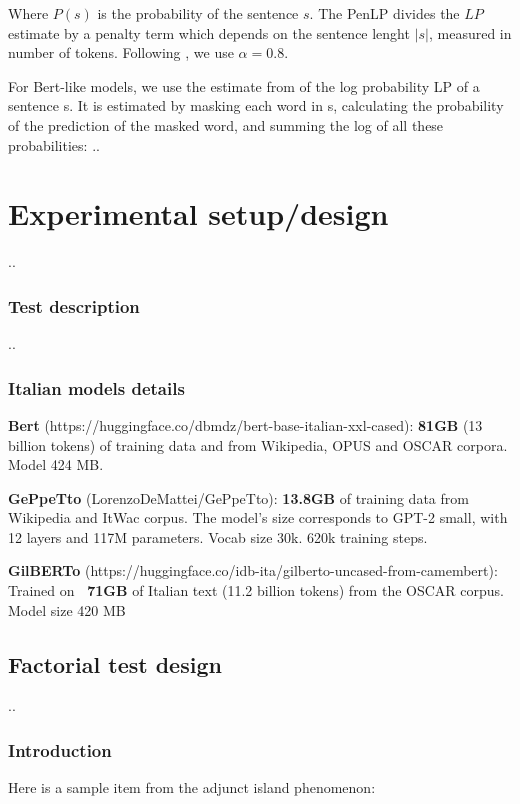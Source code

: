Where \( P(s) \) is the probability of the sentence \( s \). The PenLP divides the \( LP \) estimate by a penalty term which depends on the sentence lenght \( |s| \), measured in number of tokens. Following \citet{lau2020furiously}, we use \( \alpha=0.8 \).

For Bert-like models, we use the estimate from \citet{lau2020furiously} of the log probability LP of a sentence s. It is estimated by masking each word in s, calculating the probability of the prediction of the masked word, and summing the log of all these probabilities:
..


\chapter{Experimental setup/design}
..

\subsection{Test description}
..

\subsection{Italian models details}

\textbf{Bert} (https://huggingface.co/dbmdz/bert-base-italian-xxl-cased): \textbf{81GB} (13 billion tokens) of training data  and from Wikipedia, OPUS and OSCAR corpora. Model 
 424 MB.

\textbf{GePpeTto} (LorenzoDeMattei/GePpeTto): \textbf{13.8GB} of training data from Wikipedia and ItWac corpus. The model’s size corresponds to GPT-2 small, with 12 layers and 117M parameters. Vocab size 30k. 620k training steps.

\textbf{GilBERTo} (https://huggingface.co/idb-ita/gilberto-uncased-from-camembert): Trained on \textbf{~71GB} of Italian text (11.2 billion tokens) from the OSCAR corpus. Model size 420 MB


\section{Factorial test design}
..



\subsection{Introduction}

Here is a sample item from the adjunct island phenomenon: %

